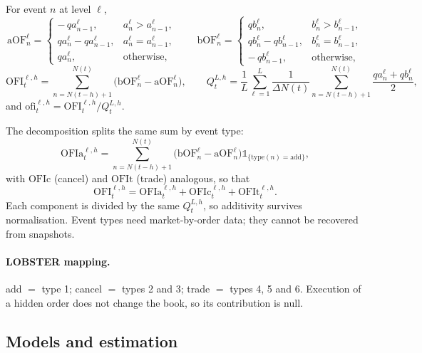 \documentclass[11pt]{article}
\newcommand{\ind}[1]{\mathbb{1}_{\{#1\}}}
\begin{document}
For event $n$ at level $\ell$,
\begin{equation}
\mathrm{aOF}_n^{\ell}=
\begin{cases}
-\,qa_{n-1}^{\ell}, & a_n^{\ell}>a_{n-1}^{\ell},\\
qa_n^{\ell}-qa_{n-1}^{\ell}, & a_n^{\ell}=a_{n-1}^{\ell},\\
qa_n^{\ell}, & \text{otherwise},
\end{cases}
\qquad
\mathrm{bOF}_n^{\ell}=
\begin{cases}
qb_n^{\ell}, & b_n^{\ell}>b_{n-1}^{\ell},\\
qb_n^{\ell}-qb_{n-1}^{\ell}, & b_n^{\ell}=b_{n-1}^{\ell},\\
-\,qb_{n-1}^{\ell}, & \text{otherwise},
\end{cases}
\end{equation}
\begin{equation}
\mathrm{OFI}_t^{\ell,h}=\sum_{n=N(t-h)+1}^{N(t)}\bigl(\mathrm{bOF}_n^{\ell}-\mathrm{aOF}_n^{\ell}\bigr),
\qquad
Q_t^{L,h}=\frac{1}{L}\sum_{\ell=1}^{L}\frac{1}{\Delta N(t)}
\sum_{n=N(t-h)+1}^{N(t)}\frac{qa_n^{\ell}+qb_n^{\ell}}{2},
\end{equation}
and $\mathrm{ofi}_t^{\ell,h}=\mathrm{OFI}_t^{\ell,h}/Q_t^{L,h}$.

The decomposition splits the same sum by event type:
\begin{equation}
\mathrm{OFIa}_t^{\ell,h}=\sum_{n=N(t-h)+1}^{N(t)}
\bigl(\mathrm{bOF}_n^{\ell}-\mathrm{aOF}_n^{\ell}\bigr)\ind{\mathrm{type}(n)=\mathrm{add}},
\end{equation}
with $\mathrm{OFIc}$ (cancel) and $\mathrm{OFIt}$ (trade) analogous, so that
\begin{equation}
\mathrm{OFI}_t^{\ell,h}=\mathrm{OFIa}_t^{\ell,h}+\mathrm{OFIc}_t^{\ell,h}+\mathrm{OFIt}_t^{\ell,h}.
\end{equation}
Each component is divided by the same $Q_t^{L,h}$, so additivity survives
normalisation. Event types need market-by-order data; they cannot be recovered
from snapshots.

\paragraph{LOBSTER mapping.} add $=$ type 1; cancel $=$ types 2 and 3; trade $=$
types 4, 5 and 6. Execution of a hidden order does not change the book, so its
contribution is null.

\subsection{Models and estimation}
\end{document}
